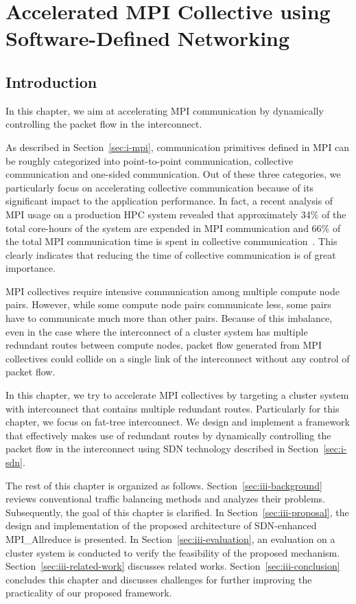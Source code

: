 \chapter{Accelerated MPI Collective using Software-Defined Networking}\label{sec:iii}

\section{Introduction}\label{sec:iii-introduction}

In this chapter, we aim at accelerating MPI communication by dynamically
controlling the packet flow in the interconnect.

As described in Section~\ref{sec:i-mpi}, communication primitives defined in
MPI can be roughly categorized into point-to-point communication, collective
communication and one-sided communication. Out of these three categories, we
particularly focus on accelerating collective communication because of its
significant impact to the application performance. In fact, a recent analysis
of MPI usage on a production HPC system revealed that approximately 34\% of
the total core-hours of the system are expended in MPI communication and 66\%
of the total MPI communication time is spent in collective
communication~\autocite{Chunduri2018}. This clearly indicates that reducing
the time of collective communication is of great importance.

MPI collectives require intensive communication among multiple compute node
pairs. However, while some compute node pairs communicate less, some pairs
have to communicate much more than other pairs. Because of this imbalance,
even in the case where the interconnect of a cluster system has multiple
redundant routes between compute nodes, packet flow generated from MPI
collectives could collide on a single link of the interconnect without any
control of packet flow.

In this chapter, we try to accelerate MPI collectives by targeting a cluster
system with interconnect that contains multiple redundant routes. Particularly
for this chapter, we focus on fat-tree interconnect. We design and implement a
framework that effectively makes use of redundant routes by dynamically
controlling the packet flow in the interconnect using SDN technology described
in Section~\ref{sec:i-sdn}.

The rest of this chapter is organized as follows.
Section~\ref{sec:iii-background} reviews conventional traffic balancing
methods and analyzes their problems. Subsequently, the goal of this chapter is
clarified. In Section~\ref{sec:iii-proposal}, the design and implementation of
the proposed architecture of SDN-enhanced MPI\_Allreduce is presented. In
Section~\ref{sec:iii-evaluation}, an evaluation on a cluster system is
conducted to verify the feasibility of the proposed mechanism.
Section~\ref{sec:iii-related-work} discusses related works.
Section~\ref{sec:iii-conclusion} concludes this chapter and discusses
challenges for further improving the practicality of our proposed framework.

